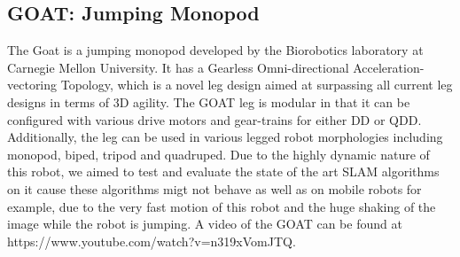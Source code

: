 \subsection{GOAT: Jumping Monopod}
The Goat is a jumping monopod developed by the Biorobotics laboratory at Carnegie Mellon University. It has a Gearless Omni-directional Acceleration-vectoring Topology, which is a novel leg design aimed at surpassing all current leg designs in terms of 3D agility. The GOAT leg is modular in that it can be configured with various drive motors and gear-trains for
either DD or QDD. Additionally, the leg can be used in various legged robot morphologies including
monopod, biped, tripod and quadruped. Due to the highly dynamic nature of this robot, we aimed to test and evaluate the state of the art SLAM algorithms on it cause these algorithms migt not behave as well as on mobile robots for example, due to the very fast motion of this robot and the huge shaking of the image while the robot is jumping. A video of the GOAT can be found at https://www.youtube.com/watch?v=n319xVomJTQ.

